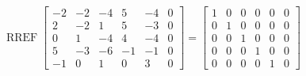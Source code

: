 \begin{exerciseAnswer} 


\[\operatorname{RREF} \left[\begin{array}{ccccc|c}
-2 & -2 & -4 & 5 & -4 & 0 \\
2 & -2 & 1 & 5 & -3 & 0 \\
0 & 1 & -4 & 4 & -4 & 0 \\
5 & -3 & -6 & -1 & -1 & 0 \\
-1 & 0 & 1 & 0 & 3 & 0
\end{array}\right] = \left[\begin{array}{ccccc|c}
1 & 0 & 0 & 0 & 0 & 0 \\
0 & 1 & 0 & 0 & 0 & 0 \\
0 & 0 & 1 & 0 & 0 & 0 \\
0 & 0 & 0 & 1 & 0 & 0 \\
0 & 0 & 0 & 0 & 1 & 0
\end{array}\right] \]



\end{exerciseAnswer}
